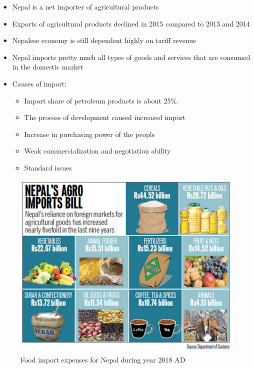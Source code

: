 \documentclass[12pt,ignorenonframetext,aspectratio=169]{beamer}
\providecommand{\tightlist}{%
  \setlength{\itemsep}{0pt}\setlength{\parskip}{0pt}}
\begin{document}
\begin{frame}{}
\protect\hypertarget{section-1}{}
\begin{itemize}
\tightlist
\item
  Nepal is a net importer of agricultural products
\item
  Exports of agricultural products declined in 2015 compared to 2013 and
  2014
\item
  Nepalese economy is still dependent highly on tariff revenue
\item
  Nepal imports pretty much all types of goods and services that are
  consumed in the domestic market
\item
  Causes of import:

  \begin{itemize}
  \tightlist
  \item
    Import share of petroleum products is about 25\%.
  \item
    The process of development caused increased import
  \item
    Increase in purchasing power of the people
  \item
    Weak commercialization and negotiation ability
  \item
    Standard issues
  \end{itemize}
\end{itemize}
\end{frame}

\begin{frame}{}
\protect\hypertarget{section-2}{}
\begin{figure}
\includegraphics[width=0.8\linewidth]{./figs/nepal_agri_import_bill_2018} \caption{Food import expenses for Nepal during year 2018 AD}\label{fig:food-import-nepal}
\end{figure}
\end{frame}
\end{document}
